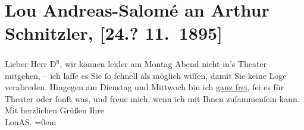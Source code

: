 

         
         \renewcommand{\erwaehntePersonen}{Personen: Lou Andreas-Salomé}
         \renewcommand{\erwaehnteOrte}{Orte: Wien}
         \renewcommand{\erwaehnteWerke}{}
               \section[Lou Andreas-Salomé an Arthur Schnitzler, {[}24.? 11. 1895{]}]{ Lou Andreas-Salomé an Arthur Schnitzler, {[}24.? 11. 1895{]}}\nopagebreak{}\rehead{ }\begin{ledgroupsized}[t]{13cm}\normalsize\beginnumbering \toendnotes[C]{\smallbreak\pagebreak[2]} 
\pstart
           \noindent{}{\pb}Lieber Herr \textsc{D\textsuperscript{r}}, wir können leider am Montag Abend nicht in’s Theater
               mitgehen, – ich laſſe es Sie ſo ſchnell als möglich wiſſen, damit Sie keine Loge
               verabreden. Hingegen am Dienstag und Mittwoch bin ich \uline{ganz frei}, ſei es für Theater oder ſonſt was, und
               freue mich, wenn ich mit Ihnen zuſammenſein kann.\pend
           \pstart
           Mit herzlichen Grüßen Ihre{\\[\baselineskip]}\spacefill\mbox{LouAS.}\pend
           \leftskip=0em{}
         
         \endnumbering{}\end{ledgroupsized}  \newcommand{\dateiname}{L00515}\newcommand{\titel}{Lou Andreas-Salomé an Arthur Schnitzler, [24.? 11. 1895]}\newcommand{\editorInnen}{Martin Anton Müller und Gerd-Hermann Susen}
      
